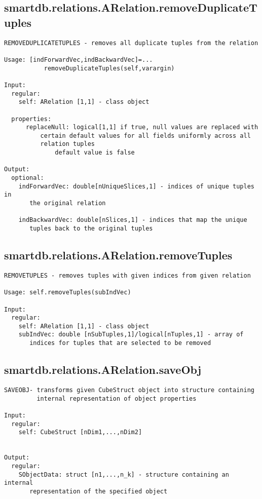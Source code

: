 \subsection{\texorpdfstring{smartdb.relations.ARelation.removeDuplicateTuples}{removeDuplicateTuples}}\label{method:smartdb.relations.ARelation.removeDuplicateTuples}
\begin{verbatim}
REMOVEDUPLICATETUPLES - removes all duplicate tuples from the relation

Usage: [indForwardVec,indBackwardVec]=...
           removeDuplicateTuples(self,varargin)

Input:
  regular:
    self: ARelation [1,1] - class object

  properties:
      replaceNull: logical[1,1] if true, null values are replaced with
          certain default values for all fields uniformly across all
          relation tuples
              default value is false

Output:
  optional:
    indForwardVec: double[nUniqueSlices,1] - indices of unique tuples in
       the original relation

    indBackwardVec: double[nSlices,1] - indices that map the unique
       tuples back to the original tuples
\end{verbatim}
\subsection{\texorpdfstring{smartdb.relations.ARelation.removeTuples}{removeTuples}}\label{method:smartdb.relations.ARelation.removeTuples}
\begin{verbatim}
REMOVETUPLES - removes tuples with given indices from given relation

Usage: self.removeTuples(subIndVec)

Input:
  regular:
    self: ARelation [1,1] - class object
    subIndVec: double [nSubTuples,1]/logical[nTuples,1] - array of
       indices for tuples that are selected to be removed
\end{verbatim}
\subsection{\texorpdfstring{smartdb.relations.ARelation.saveObj}{saveObj}}\label{method:smartdb.relations.ARelation.saveObj}
\begin{verbatim}
SAVEOBJ- transforms given CubeStruct object into structure containing
         internal representation of object properties

Input:
  regular:
    self: CubeStruct [nDim1,...,nDim2]


Output:
  regular:
    SObjectData: struct [n1,...,n_k] - structure containing an internal
       representation of the specified object
\end{verbatim}
